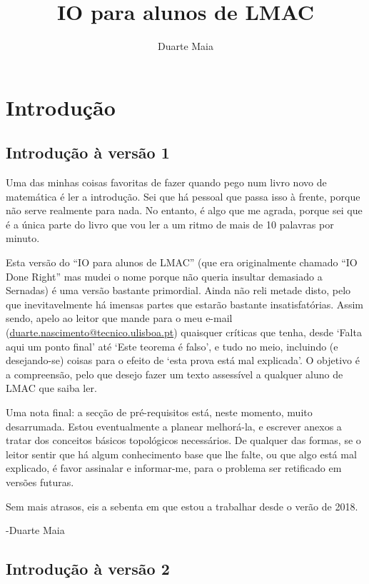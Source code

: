 \documentclass{article}
\title{IO para alunos de LMAC}
\author{Duarte Maia \\ \myemailref}
\date{}
\makeatletter
\newcommand{\myemail}{duarte.nascimento@tecnico.ulisboa.pt}
\newcommand{\myemailref}{\href{mailto:\myemail}{\myemail}}
\theoremstyle{definition}
\makeatother
\begin{document}
	\maketitle
	
	\tableofcontents
	
	\section{Introdução}
	
	\subsection{Introdução à versão 1}
	
	Uma das minhas coisas favoritas de fazer quando pego num livro novo de matemática é ler a introdução. Sei que há pessoal que passa isso à frente, porque não serve realmente para nada. No entanto, é algo que me agrada, porque sei que é a única parte do livro que vou ler a um ritmo de mais de 10 palavras por minuto.
	
	Esta versão do ``IO para alunos de LMAC'' (que era originalmente chamado ``IO Done Right'' mas mudei o nome porque não queria insultar demasiado a Sernadas) é uma versão bastante primordial. Ainda não reli metade disto, pelo que inevitavelmente há imensas partes que estarão bastante insatisfatórias. Assim sendo, apelo ao leitor que mande para o meu e-mail (\myemailref) quaisquer críticas que tenha, desde `Falta aqui um ponto final' até `Este teorema é falso', e tudo no meio, incluindo (e desejando-se) coisas para o efeito de `esta prova está mal explicada'. O objetivo é a compreensão, pelo que desejo fazer um texto assessível a qualquer aluno de LMAC que saiba ler.
	
	Uma nota final: a secção de pré-requisitos está, neste momento, muito desarrumada. Estou eventualmente a planear melhorá-la, e escrever anexos a tratar dos conceitos básicos topológicos necessários. De qualquer das formas, se o leitor sentir que há algum conhecimento base que lhe falte, ou que algo está mal explicado, é favor assinalar e informar-me, para o problema ser retificado em versões futuras.
	
	Sem mais atrasos, eis a sebenta em que estou a trabalhar desde o verão de 2018.
	
	-Duarte Maia
	
	\subsection{Introdução à versão 2}
	
\end{document}
